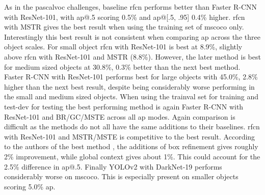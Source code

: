 As in the \gls{pascalvoc} challenges, baseline \gls{rfcn} performs better than Faster R-CNN with ResNet-101, with \gls{ap}@.5 scoring 0.5\% and \gls{ap}@[.5, .95] 0.4\% higher. \gls{rfcn} with MSTR gives the best result when using the training set of \gls{mscoco} only. Interestingly this best result is not consistent when comparing \gls{ap} across the three object scales. For small object \gls{rfcn} with ResNet-101 is best at 8.9\%, slightly above \gls{rfcn} with ResNet-101 and MSTR (8.8\%). However, the later method is best for medium sized objects at 30.8\%, 0.3\% better than the next best method. Faster R-CNN with ResNet-101 performs best for large objects with 45.0\%, 2.8\% higher than the next best result, despite being considerably worse performing in the small and medium sized objects. When using the trainval set for training and test-dev for testing the best performing method is again Faster R-CNN with ResNet-101 and BR/GC/MSTE across all \gls{ap} modes. Again comparison is difficult as the methods do not all have the same additions to their baselines. \gls{rfcn} with ResNet-101 and MSTR/MSTE is competitive to the best result. According to the authors of the best method \cite{deepres}, the additions of box refinement gives roughly 2\% improvement, while global context gives about 1\%. This could account for the 2.5\% difference in \gls{ap}@.5. Finally YOLOv2 with DarkNet-19 performs considerably worse on \gls{mscoco}. This is especially present on smaller objects scoring 5.0\% \gls{ap}.
